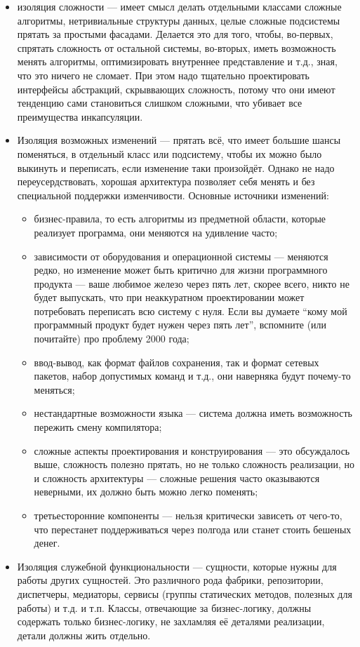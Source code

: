 \documentclass[a5paper]{article}
\begin{document}
\begin{itemize}
	\item изоляция сложности --- имеет смысл делать отдельными классами сложные алгоритмы, нетривиальные структуры данных, целые сложные подсистемы прятать за простыми фасадами. Делается это для того, чтобы, во-первых, спрятать сложность от остальной системы, во-вторых, иметь возможность менять алгоритмы, оптимизировать внутреннее представление и т.д., зная, что это ничего не сломает. При этом надо тщательно проектировать интерфейсы абстракций, скрыввающих сложность, потому что они имеют тенденцию сами становиться слишком сложными, что убивает все преимущества инкапсуляции.
	\item Изоляция возможных изменений --- прятать всё, что имеет большие шансы поменяться, в отдельный класс или подсистему, чтобы их можно было выкинуть и переписать, если изменение таки произойдёт. Однако не надо переусердствовать, хорошая архитектура позволяет себя менять и без специальной поддержки изменчивости. Основные источники изменений:
	\begin{itemize}
		\item бизнес-правила, то есть алгоритмы из предметной области, которые реализует программа, они меняются на удивление часто;
		\item зависимости от оборудования и операционной системы --- меняются редко, но изменение может быть критично для жизни программного продукта --- ваше любимое железо через пять лет, скорее всего, никто не будет выпускать, что при неаккуратном проектировании может потребовать переписать всю систему с нуля. Если вы думаете ``кому мой программный продукт будет нужен через пять лет'', вспомните (или почитайте) про проблему 2000 года;
		\item ввод-вывод, как формат файлов сохранения, так и формат сетевых пакетов, набор допустимых команд и т.д., они наверняка будут почему-то меняться;
		\item нестандартные возможности языка --- система должна иметь возможность пережить смену компилятора;
		\item сложные аспекты проектирования и конструирования --- это обсуждалось выше, сложность полезно прятать, но не только сложность реализации, но и сложность архитектуры --- сложные решения часто оказываются неверными, их должно быть можно легко поменять;
		\item третьесторонние компоненты --- нельзя критически зависеть от чего-то, что перестанет поддерживаться через полгода или станет стоить бешеных денег.
	\end{itemize}
	\item Изоляция служебной функциональности --- сущности, которые нужны для работы других сущностей. Это различного рода фабрики, репозитории, диспетчеры, медиаторы, сервисы (группы статических методов, полезных для работы) и т.д. и т.п. Классы, отвечающие за бизнес-логику, должны содержать только бизнес-логику, не захламляя её деталями реализации, детали должны жить отдельно.
\end{itemize}
\end{document}
